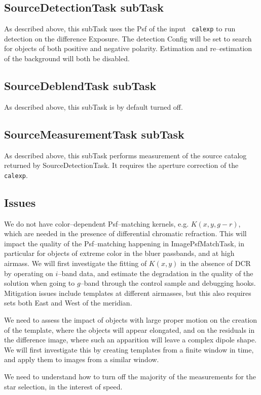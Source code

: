 \documentclass[12pt]{article}
\begin{document}
\subsection{SourceDetectionTask subTask}
As described above, this subTask uses the Psf of the input {\tt
  calexp} to run detection on the difference Exposure.  The detection
Config will be set to search for objects of both positive and negative
polarity.  Estimation and re--estimation of the background will both
be disabled.

\subsection{SourceDeblendTask subTask}
As described above, this subTask is by default turned off.

\subsection{SourceMeasurementTask subTask}
As described above, this subTask performs measurement of the source
catalog returned by SourceDetectionTask.  It requires the aperture
correction of the {\tt calexp}.

\subsection{Issues}
We do not have color--dependent Psf--matching kernels,
e.g. $K(x,y,g-r)$, which are needed in the presence of differential
chromatic refraction.  This will impact the quality of the
Psf--matching happening in ImagePsfMatchTask, in particular for
objects of extreme color in the bluer passbands, and at high airmass.
We will first investigate the fitting of $K(x,y)$ in the absence of
DCR by operating on $i$--band data, and estimate the degradation in
the quality of the solution when going to $g$--band through the
control sample and debugging hooks.  Mitigation issues include
templates at different airmasses, but this also requires sets both East
and West of the meridian.

We need to assess the impact of objects with large proper motion on
the creation of the template, where the objects will appear elongated,
and on the residuals in the difference image, where such an apparition
will leave a complex dipole shape.  We will first investigate this by
creating templates from a finite window in time, and apply them to
images from a similar window.

We need to understand how to turn off the majority of the measurements
for the star selection, in the interest of speed.
\end{document}
